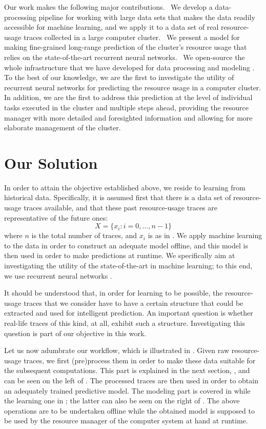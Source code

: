 Our work makes the following major contributions. \one~We develop a
data-processing pipeline for working with large data sets that makes the data
readily accessible for machine learning, and we apply it to a data set of real
resource-usage traces collected in a large computer cluster. \two~We present a
model for making fine-grained long-range prediction of the cluster's resource
usage that relies on the state-of-the-art recurrent neural networks. \three~We
open-source the whole infrastructure that we have developed for data processing
and modeling \cite{sources}. To the best of our knowledge, we are the first to
investigate the utility of recurrent neural networks for predicting the resource
usage in a computer cluster. In addition, we are the first to address this
prediction at the level of individual tasks executed in the cluster and multiple
steps ahead, providing the resource manager with more detailed and foresighted
information and allowing for more elaborate management of the cluster.

\section{Our Solution}

In order to attain the objective established above, we reside to learning from
historical data. Specifically, it is assumed first that there is a data set of
resource-usage traces available, and that these past resource-usage traces are
representative of the future ones:
\[
  X = \{ x_i: i = 0, \dots, n - 1 \}
\]
where $n$ is the total number of traces, and $x_i$ is as in . We
apply machine learning to the data in order to construct an adequate model
offline, and this model is then used in order to make predictions at runtime. We
specifically aim at investigating the utility of the state-of-the-art in machine
learning; to this end, we use recurrent neural networks \cite{goodfellow2016}.

It should be understood that, in order for learning to be possible, the
resource-usage traces that we consider have to have a certain structure that
could be extracted and used for intelligent prediction. An important question is
whether real-life traces of this kind, at all, exhibit such a structure.
Investigating this question is part of our objective in this work.

Let us now adumbrate our workflow, which is illustrated in .
Given raw resource-usage traces, we first (pre)process them in order to make
these data suitable for the subsequent computations. This part is explained in
the next section, , and can be seen on the left of .
The processed traces are then used in order to obtain an adequately trained
predictive model. The modeling part is covered in  while the
learning one in ; the latter can also be seen on the right of
. The above operations are to be undertaken offline while the
obtained model is supposed to be used by the resource manager of the computer
system at hand at runtime.

